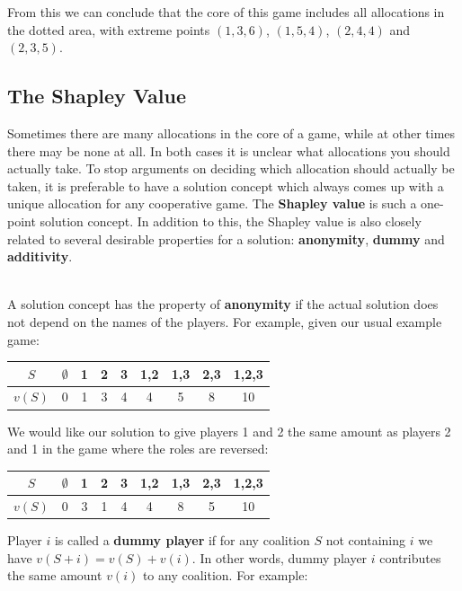 \documentclass[12pt]{article}
\begin{document}
\noindent
From this we can conclude that the core of this game includes all allocations in the dotted area, with extreme points $(1, 3, 6)$, $(1, 5, 4)$, $(2, 4, 4)$ and $(2, 3, 5)$.

\newpage
\subsection{The Shapley Value}
Sometimes there are many allocations in the core of a game, while at other times there may be none at all.
In both cases it is unclear what allocations you should actually take.
To stop arguments on deciding which allocation should actually be taken, it is preferable to have a solution concept which always comes up with a unique allocation for any cooperative game.
The \textbf{Shapley value} is such a one-point solution concept.
In addition to this, the Shapley value is also closely related to several desirable properties for a solution: \textbf{anonymity}, \textbf{dummy} and \textbf{additivity}.

\noindent
\\
A solution concept has the property of \textbf{anonymity} if the actual solution does not depend on the names of the players.
For example, given our usual example game:

\begin{table}[h]
    \centering
    \begin{tabular}{|c|cccccccc|}
    \hline
    $S$ & $\emptyset$ & 1 & 2 & 3 & 1,2 & 1,3 & 2,3 & 1,2,3 \\ \hline
    $v(S)$ & 0 & 1 & 3 & 4 & 4 & 5 & 8 & 10 \\ \hline
    \end{tabular}
\end{table}

\noindent
We would like our solution to give players 1 and 2 the same amount as players 2 and 1 in the game where the roles are reversed:

\begin{table}[h]
    \centering
    \begin{tabular}{|c|cccccccc|}
    \hline
    $S$ & $\emptyset$ & 1 & 2 & 3 & 1,2 & 1,3 & 2,3 & 1,2,3 \\ \hline
    $v(S)$ & 0 & 3 & 1 & 4 & 4 & 8 & 5 & 10 \\ \hline
    \end{tabular}
\end{table}

\noindent
Player $i$ is called a \textbf{dummy player} if for any coalition $S$ not containing $i$ we have $v(S + i) = v(S) + v(i)$.
In other words, dummy player $i$ contributes the same amount $v(i)$ to any coalition.
For example:
\end{document}
